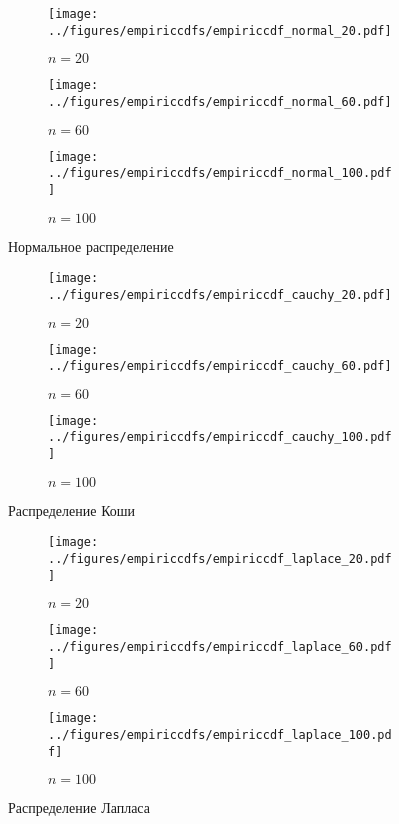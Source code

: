 \documentclass[12pt]{article}
\begin{document}
	\begin{figure}[H]
		\centering
		\begin{subfigure}[t]{.3\linewidth}
			\centering\texttt{[image: ../figures/empiriccdfs/empiriccdf\_normal\_20.pdf]}
			\caption*{$n = 20$}
		\end{subfigure}
		\begin{subfigure}[t]{.3\linewidth}
			\centering\texttt{[image: ../figures/empiriccdfs/empiriccdf\_normal\_60.pdf]}
			\caption*{$n = 60$}
		\end{subfigure}
		\begin{subfigure}[t]{.3\linewidth}
			\centering\texttt{[image: ../figures/empiriccdfs/empiriccdf\_normal\_100.pdf]}
			\caption*{$n = 100$}
		\end{subfigure}
		\caption{Нормальное распределение}
	\end{figure}
	\begin{figure}[H]
		\centering
		\begin{subfigure}[t]{.3\linewidth}
			\centering\texttt{[image: ../figures/empiriccdfs/empiriccdf\_cauchy\_20.pdf]}
			\caption*{$n = 20$}
		\end{subfigure}
		\begin{subfigure}[t]{.3\linewidth}
			\centering\texttt{[image: ../figures/empiriccdfs/empiriccdf\_cauchy\_60.pdf]}
			\caption*{$n = 60$}
		\end{subfigure}
		\begin{subfigure}[t]{.3\linewidth}
			\centering\texttt{[image: ../figures/empiriccdfs/empiriccdf\_cauchy\_100.pdf]}
			\caption*{$n = 100$}
		\end{subfigure}
		\caption{Распределение Коши}
	\end{figure}
	\begin{figure}[H]
		\centering
		\begin{subfigure}[t]{.3\linewidth}
			\centering\texttt{[image: ../figures/empiriccdfs/empiriccdf\_laplace\_20.pdf]}
			\caption*{$n = 20$}
		\end{subfigure}
		\begin{subfigure}[t]{.3\linewidth}
			\centering\texttt{[image: ../figures/empiriccdfs/empiriccdf\_laplace\_60.pdf]}
			\caption*{$n = 60$}
		\end{subfigure}
		\begin{subfigure}[t]{.3\linewidth}
			\centering\texttt{[image: ../figures/empiriccdfs/empiriccdf\_laplace\_100.pdf]}
			\caption*{$n = 100$}
		\end{subfigure}
		\caption{Распределение Лапласа}
	\end{figure}
\end{document}
